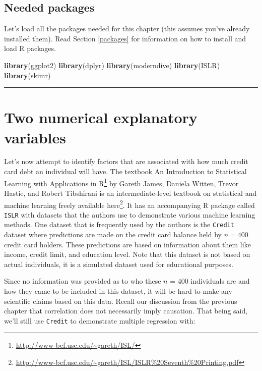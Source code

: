 \documentclass[12pt, krantz2,]{krantz}
\makeatletter
\newenvironment{Shaded}{\begin{snugshade}}{\end{snugshade}}
\newcommand{\KeywordTok}[1]{\textcolor[rgb]{0.27,0.27,0.27}{\textbf{#1}}}
\newcommand{\NormalTok}[1]{#1}
\renewcommand{\href}[2]{#2\footnote{\url{#1}}}
\newenvironment{kframe}{%
\medskip{}
\setlength{\fboxsep}{.8em}
 \def\at@end@of@kframe{}%
 \ifinner\ifhmode%
  \def\at@end@of@kframe{\end{minipage}}%
  \begin{minipage}{\columnwidth}%
 \fi\fi%
 \def\FrameCommand##1{\hskip\@totalleftmargin \hskip-\fboxsep
 \colorbox{shadecolor}{##1}\hskip-\fboxsep
     \hskip-\linewidth \hskip-\@totalleftmargin \hskip\columnwidth}%
 \MakeFramed {\advance\hsize-\width
   \@totalleftmargin\z@ \linewidth\hsize
   \@setminipage}}%
 {\par\unskip\endMakeFramed%
 \at@end@of@kframe}
\renewenvironment{Shaded}{\begin{kframe}}{\end{kframe}}
\makeatother
\begin{document}
\hypertarget{needed-packages-4}{%
\subsection*{Needed packages}\label{needed-packages-4}}


Let's load all the packages needed for this chapter (this assumes you've already installed them). Read Section \ref{packages} for information on how to install and load R packages.

\begin{Shaded}
\begin{Highlighting}[]
\KeywordTok{library}\NormalTok{(ggplot2)}
\KeywordTok{library}\NormalTok{(dplyr)}
\KeywordTok{library}\NormalTok{(moderndive)}
\KeywordTok{library}\NormalTok{(ISLR)}
\KeywordTok{library}\NormalTok{(skimr)}
\end{Highlighting}
\end{Shaded}

\begin{center}\rule{0.5\linewidth}{\linethickness}\end{center}

\hypertarget{model3}{%
\section{Two numerical explanatory variables}\label{model3}}

Let's now attempt to identify factors that are associated with how much credit card debt an individual will have. The textbook \href{http://www-bcf.usc.edu/~gareth/ISL/}{An Introduction to Statistical Learning with Applications in R} by Gareth James, Daniela Witten, Trevor Hastie, and Robert Tibshirani is an intermediate-level textbook on statistical and machine learning freely available \href{http://www-bcf.usc.edu/~gareth/ISL/ISLR\%20Seventh\%20Printing.pdf}{here}. It has an accompanying R package called \texttt{ISLR} with datasets that the authors use to demonstrate various machine learning methods. One dataset that is frequently used by the authors is the \texttt{Credit} dataset where predictions are made on the credit card balance held by \(n = 400\) credit card holders. These predictions are based on information about them like income, credit limit, and education level. Note that this dataset is not based on actual individuals, it is a simulated dataset used for educational purposes.

Since no information was provided as to who these \(n\) = 400 individuals are and how they came to be included in this dataset, it will be hard to make any scientific claims based on this data. Recall our discussion from the previous chapter that correlation does not necessarily imply causation. That being said, we'll still use \texttt{Credit} to demonstrate multiple regression with:
\end{document}
